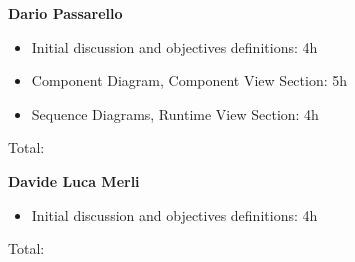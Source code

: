 \textbf{Dario Passarello}
\begin{itemize}
    \item Initial discussion and objectives definitions: 4h
    \item Component Diagram, Component View Section: 5h
    \item Sequence Diagrams, Runtime View Section: 4h
\end{itemize}

Total:

\bigskip

\textbf{Davide Luca Merli}

\begin{itemize}
    \item Initial discussion and objectives definitions: 4h
\end{itemize}

Total: